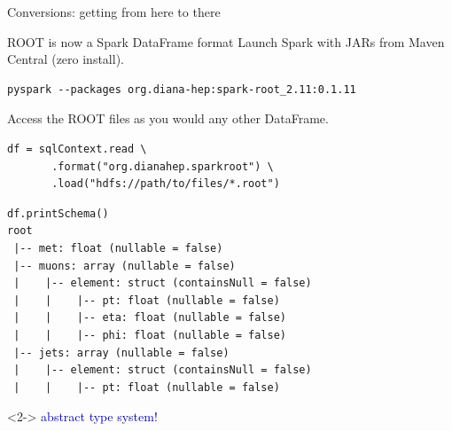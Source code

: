 \documentclass{beamer}
\begin{document}
\begin{frame}{Conversions: getting from here to there}
\vspace{0.5 cm}
\mbox{\hspace{-0.75 cm}}
\end{frame}

\begin{frame}[fragile]{ROOT is now a Spark DataFrame format}
\vspace{0.5 cm}
Launch Spark with JARs from Maven Central (zero install).

\vspace{-0.05 cm}
\footnotesize
\begin{verbatim}
pyspark --packages org.diana-hep:spark-root_2.11:0.1.11
\end{verbatim}

\normalsize
\vspace{0.25 cm}
Access the ROOT files as you would any other DataFrame.

\footnotesize
\begin{verbatim}
df = sqlContext.read \
       .format("org.dianahep.sparkroot") \
       .load("hdfs://path/to/files/*.root")
\end{verbatim}

\begin{verbatim}
df.printSchema()
root
 |-- met: float (nullable = false)
 |-- muons: array (nullable = false)
 |    |-- element: struct (containsNull = false)
 |    |    |-- pt: float (nullable = false)
 |    |    |-- eta: float (nullable = false)
 |    |    |-- phi: float (nullable = false)
 |-- jets: array (nullable = false)
 |    |-- element: struct (containsNull = false)
 |    |    |-- pt: float (nullable = false)
\end{verbatim}

\vspace{-4 cm}
\begin{uncoverenv}<2->
\hfill\textcolor{darkblue}{\Large abstract type system!}\hspace{-1 cm}
\end{uncoverenv}
\vspace{4 cm}
\end{frame}

\begin{frame}{}


\begin{onlyenv}<2>
\vspace{-6.
\end{onlyenv}
\end{frame}
\end{document}
